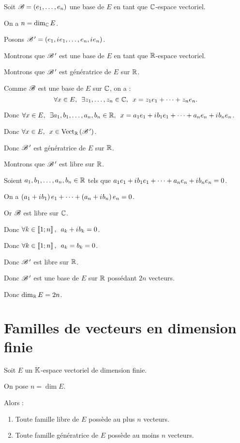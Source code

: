 \begin{dem}
Soit \(\mathscr{B}=\left(e_1,\dots,e_n\right)\) une base de \(E\) en tant que \(\mathbb{C}\)-espace vectoriel.

On a \(n=\dim_{\mathbb{C}} E\).

Posons \(\mathscr{B}^{\,\prime}=\left(e_1,i\mkern1mu e_1,\dots,e_n,i\mkern1mu e_n\right)\).

Montrons que \(\mathscr{B}^{\,\prime}\) est une base de \(E\) en tant que \(\mathbb{R}\)-espace vectoriel.

Montrons que \(\mathscr{B}^{\,\prime}\) est génératrice de \(E\) sur \(\mathbb{R}\).

Comme \(\mathscr{B}\) est une base de \(E\) sur \(\mathbb{C}\), on a : \[\quantifs{\forall x\in E;\exists z_1,\dots,z_n\in\C}x=z_1e_1+\dots+z_ne_n.\]

Donc \(\quantifs{\forall x\in E;\exists a_1,b_1,\dots,a_n,b_n\in\R}x=a_1e_1+\i b_1e_1+\dots+a_ne_n+\i b_ne_n\).

Donc \(\quantifs{\forall x\in E}x\in\Vect[\R]{\fami{B}\prim}\).

Donc \(\mathscr{B}^{\,\prime}\) est génératrice de \(E\) sur \(\mathbb{R}\).

Montrons que \(\mathscr{B}^{\,\prime}\) est libre sur \(\mathbb{R}\).

Soient \(a_1,b_1,\dots,a_n,b_n\in\mathbb{R}\) tels que \(a_1e_1+i\mkern1mu b_1e_1+\dots+a_ne_n+i\mkern1mu b_ne_n=0\).

On a \(\left(a_1+i\mkern1mu b_1\right)e_1+\dots+\left(a_n+i\mkern1mu b_n\right)e_n=0\).

Or \(\mathscr{B}\) est libre sur \(\mathbb{C}\).

Donc \(\quantifs{\forall k\in\interventierii{1}{n}}a_k+\i b_k=0\).

Donc \(\quantifs{\forall k\in\interventierii{1}{n}}a_k=b_k=0\).

Donc \(\mathscr{B}^{\,\prime}\) est libre sur \(\mathbb{R}\).

Donc \(\mathscr{B}^{\,\prime}\) est une base de \(E\) sur \(\mathbb{R}\) possédant \(2n\) vecteurs.

Donc \(\dim_{\mathbb{R}} E=2n\).
\end{dem}

\section{Familles de vecteurs en dimension finie}

\begin{theo}
Soit \(E\) un \(\mathbb{K}\)-espace vectoriel de dimension finie.

On pose \(n=\dim E\).

Alors :

\begin{enumerate}
\item Toute famille libre de \(E\) possède au plus \(n\) vecteurs. \\

\item Toute famille génératrice de \(E\) possède au moins \(n\) vecteurs.
\end{enumerate}
\end{theo}

